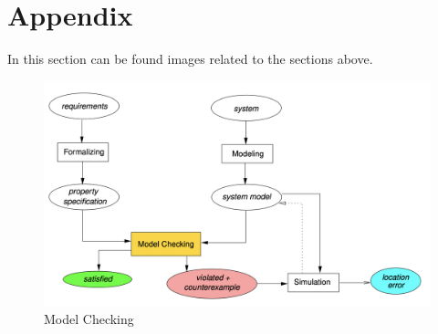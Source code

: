 \documentclass[a4paper, twocolumn]{article}
\begin{document}
\section{Appendix} \label{appendix}
In this section can be found images related to the sections above.

\begin{figure}[h]
    \centering
    \includegraphics[scale=0.3]{images/modelCheck.png}
    \caption{Model Checking}
    \label{fig:modelCheck} 
\end{figure}
\end{document}

